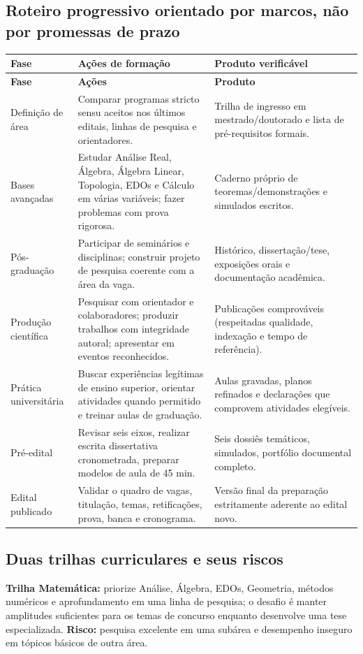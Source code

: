 \documentclass[11pt,a4paper]{article}
\begin{document}
\subsection{Roteiro progressivo orientado por marcos, não por promessas de prazo}
\begin{longtable}{p{}p{}p{}}
\toprule
\textbf{Fase} & \textbf{Ações de formação} & \textbf{Produto verificável}\\\midrule
\endfirsthead
\toprule\textbf{Fase}&\textbf{Ações}&\textbf{Produto}\\\midrule\endhead
Definição de área & Comparar programas stricto sensu aceitos nos últimos editais, linhas de pesquisa e orientadores. & Trilha de ingresso em mestrado/doutorado e lista de pré-requisitos formais.\\
Bases avançadas & Estudar Análise Real, Álgebra, Álgebra Linear, Topologia, EDOs e Cálculo em várias variáveis; fazer problemas com prova rigorosa. & Caderno próprio de teoremas/demonstrações e simulados escritos.\\
Pós-graduação & Participar de seminários e disciplinas; construir projeto de pesquisa coerente com a área da vaga. & Histórico, dissertação/tese, exposições orais e documentação acadêmica.\\
Produção científica & Pesquisar com orientador e colaboradores; produzir trabalhos com integridade autoral; apresentar em eventos reconhecidos. & Publicações comprováveis (respeitadas qualidade, indexação e tempo de referência).\\
Prática universitária & Buscar experiências legítimas de ensino superior, orientar atividades quando permitido e treinar aulas de graduação. & Aulas gravadas, planos refinados e declarações que comprovem atividades elegíveis.\\
Pré-edital & Revisar seis eixos, realizar escrita dissertativa cronometrada, preparar modelos de aula de 45 min. & Seis dossiês temáticos, simulados, portfólio documental completo.\\
Edital publicado & Validar o quadro de vagas, titulação, temas, retificações, prova, banca e cronograma. & Versão final da preparação estritamente aderente ao edital novo.\\\bottomrule
\end{longtable}

\subsection{Duas trilhas curriculares e seus riscos}
\textbf{Trilha Matemática:} priorize Análise, Álgebra, EDOs, Geometria, métodos numéricos e aprofundamento em uma linha de pesquisa; o desafio é manter amplitudes suficientes para os temas de concurso enquanto desenvolve uma tese especializada. \textbf{Risco:} pesquisa excelente em uma subárea e desempenho inseguro em tópicos básicos de outra área.
\end{document}

